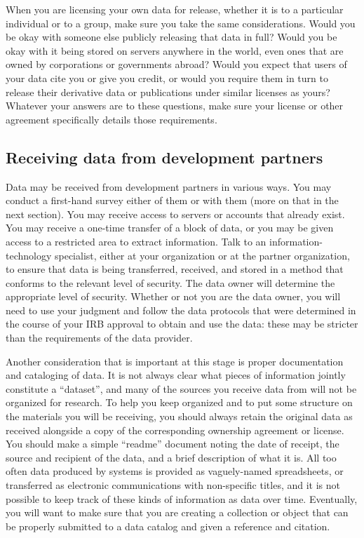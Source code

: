 When you are licensing your own data for release,
whether it is to a particular individual or to a group,
make sure you take the same considerations.
Would you be okay with someone else publicly releasing that data in full?
Would you be okay with it being stored on servers anywhere in the world,
even ones that are owned by corporations or governments abroad?
Would you expect that users of your data cite you or give you credit,
or would you require them in turn to release
their derivative data or publications under similar licenses as yours?
Whatever your answers are to these questions,
make sure your license or other agreement
specifically details those requirements.

\subsection{Receiving data from development partners}

Data may be received from development partners in various ways.
You may conduct a first-hand survey either of them or with them
(more on that in the next section).
You may receive access to servers or accounts that already exist.
You may receive a one-time transfer of a block of data,
or you may be given access to a restricted area to extract information.
Talk to an information-technology specialist,
either at your organization or at the partner organization,
to ensure that data is being transferred, received, and stored
in a method that conforms to the relevant level of security.
The data owner will determine the appropriate level of security.
Whether or not you are the data owner, you will need to use your judgment
and follow the data protocols that were determined
in the course of your IRB approval to obtain and use the data:
these may be stricter than the requirements of the data provider.

Another consideration that is important at this stage is proper documentation and cataloging of data.
It is not always clear what pieces of information jointly constitute a ``dataset'',
and many of the sources you receive data from will not be organized for research.
To help you keep organized and to put some structure on the materials you will be receiving,
you should always retain the original data as received
alongside a copy of the corresponding ownership agreement or license.
You should make a simple ``readme'' document noting the date of receipt,
the source and recipient of the data, and a brief description of what it is.
All too often data produced by systems is provided as vaguely-named spreadsheets,
or transferred as electronic communications with non-specific titles,
and it is not possible to keep track of these kinds of information as data over time.
Eventually, you will want to make sure that you are creating a collection or object
that can be properly submitted to a data catalog and given a reference and citation.

